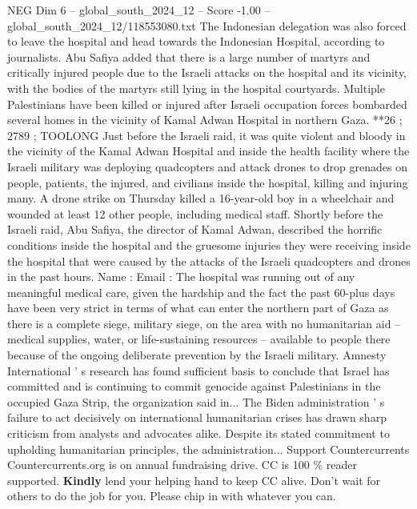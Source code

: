\begin{textsample}{NEG Dim 6 – global\_south\_2024\_12 – Score -1.00 – global\_south\_2024\_12/118553080.txt}
The Indonesian delegation was also forced to leave the hospital and head towards the Indonesian Hospital, according to journalists.
Abu Safiya added that there is a large number of martyrs and critically injured people due to the Israeli attacks on the hospital and its vicinity, with the bodies of the martyrs still lying in the hospital courtyards.
Multiple Palestinians have been killed or injured after Israeli occupation forces bombarded several homes in the vicinity of Kamal Adwan Hospital in northern Gaza. **26 ; 2789 ; TOOLONG Just before the Israeli raid, it was quite violent and bloody in the vicinity of the Kamal Adwan Hospital and inside the health facility where the Israeli military was deploying quadcopters and attack drones to drop grenades on people, patients, the injured, and civilians inside the hospital, killing and injuring many.
A drone strike on Thursday killed a 16-year-old boy in a wheelchair and wounded at least 12 other people, including medical staff.
Shortly before the Israeli raid, Abu Safiya, the director of Kamal Adwan, described the horrific conditions inside the hospital and the gruesome injuries they were receiving inside the hospital that were caused by the attacks of the Israeli quadcopters and drones in the past hours.
Name : Email : The hospital was running out of any meaningful medical care, given the hardship and the fact the past 60-plus days have been very strict in terms of what can enter the northern part of Gaza as there is a complete siege, military siege, on the area with no humanitarian aid -- medical supplies, water, or life-sustaining resources -- available to people there because of the ongoing deliberate prevention by the Israeli military.
Amnesty International ' s research has found sufficient basis to conclude that Israel has committed and is continuing to commit genocide against Palestinians in the occupied Gaza Strip, the organization said in...
The Biden administration ' s failure to act decisively on international humanitarian crises has drawn sharp criticism from analysts and advocates alike.
Despite its stated commitment to upholding humanitarian principles, the administration...
Support Countercurrents Countercurrents.org is on annual fundraising drive.
CC is 100 \% reader supported. \textbf{Kindly} lend your helping hand to keep CC alive.
Don't wait for others to do the job for you.
Please chip in with whatever you can.

\end{textsample}
